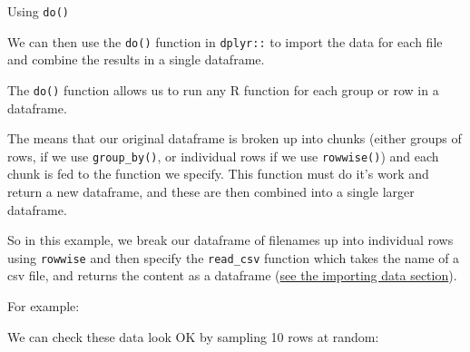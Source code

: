\documentclass[]{article}
\newenvironment{Shaded}{\begin{snugshade}}{\end{snugshade}}
\newcommand{\CommentTok}[1]{\textcolor[rgb]{0.56,0.35,0.01}{\textit{#1}}}
\newcommand{\DataTypeTok}[1]{\textcolor[rgb]{0.13,0.29,0.53}{#1}}
\newcommand{\DecValTok}[1]{\textcolor[rgb]{0.00,0.00,0.81}{#1}}
\newcommand{\KeywordTok}[1]{\textcolor[rgb]{0.13,0.29,0.53}{\textbf{#1}}}
\newcommand{\NormalTok}[1]{#1}
\newcommand{\OperatorTok}[1]{\textcolor[rgb]{0.81,0.36,0.00}{\textbf{#1}}}
\newcommand{\StringTok}[1]{\textcolor[rgb]{0.31,0.60,0.02}{#1}}
\begin{document}
Using \texttt{do()}

We can then use the \texttt{do()} function in \texttt{dplyr::} to import the data for each
file and combine the results in a single dataframe.

The \texttt{do()} function allows us to run any R function for each group or row in a
dataframe.

The means that our original dataframe is broken up into chunks (either groups of
rows, if we use \texttt{group\_by()}, or individual rows if we use \texttt{rowwise()}) and each
chunk is fed to the function we specify. This function must do it's work and
return a new dataframe, and these are then combined into a single larger
dataframe.

So in this example, we break our dataframe of filenames up into individual rows
using \texttt{rowwise} and then specify the \texttt{read\_csv} function which takes the name of
a csv file, and returns the content as a dataframe
(\protect\hyperlink{importing-data}{see the importing data section}).

For example:

\begin{Shaded}
\end{Shaded}

We can check these data look OK by sampling 10 rows at random:

\begin{Shaded}
\end{Shaded}
\end{document}
